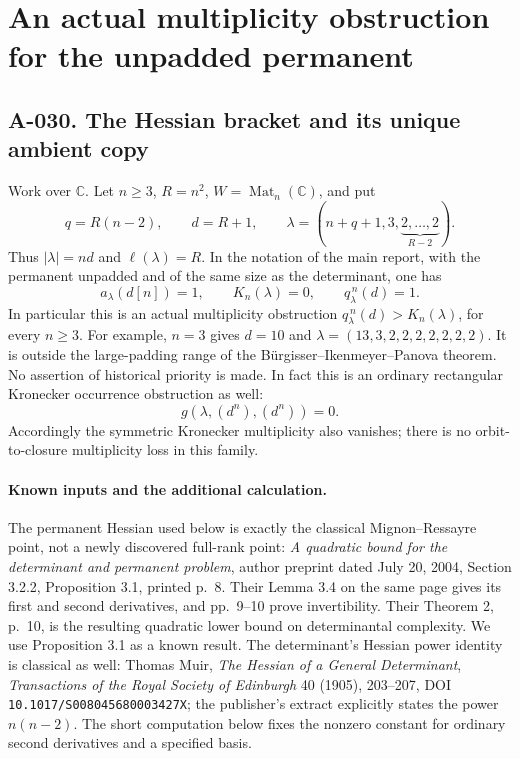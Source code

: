 \section{An actual multiplicity obstruction for the unpadded permanent}

\subsection*{A-030. The Hessian bracket and its unique ambient copy}
Work over \(\mathbb C\). Let \(n\geq3\), \(R=n^2\),
\(W=\operatorname{Mat}_n(\mathbb C)\), and put
\[
 q=R(n-2),\qquad d=R+1,\qquad
 \lambda=(n+q+1,3,\underbrace{2,\ldots,2}_{R-2}).       \tag{A-030.1}
\]
Thus \(|\lambda|=nd\) and \(\ell(\lambda)=R\).
In the notation of the main report, with the permanent unpadded
and of the same size as the determinant, one has
\[
 a_\lambda(d[n])=1,\qquad
 K_n(\lambda)=0,\qquad
 q_\lambda^{\,n}(d)=1.                               \tag{A-030.2}
\]
In particular this is an actual multiplicity obstruction
\(q_\lambda^{\,n}(d)>K_n(\lambda)\), for every \(n\geq3\).
For example, \(n=3\) gives \(d=10\) and
\(\lambda=(13,3,2,2,2,2,2,2,2)\).
It is outside the large-padding range of the B\"urgisser--Ikenmeyer--Panova
theorem. No assertion of historical priority is made.
In fact this is an ordinary rectangular Kronecker occurrence
obstruction as well:
\[
               g(\lambda,(d^n),(d^n))=0.                       \tag{A-030.2a}
\]
Accordingly the symmetric Kronecker multiplicity also vanishes;
there is no orbit-to-closure multiplicity loss in this family.

\paragraph{Known inputs and the additional calculation.}
The permanent Hessian used below is exactly the classical
Mignon--Ressayre point, not a newly discovered full-rank point:
\emph{A quadratic bound for the determinant and permanent problem},
author preprint dated July 20, 2004, Section 3.2.2,
Proposition 3.1, printed p.~8. Their Lemma 3.4 on the same page
gives its first and second derivatives, and pp.~9--10 prove
invertibility. Their Theorem 2, p.~10, is the resulting quadratic
lower bound on determinantal complexity. We use Proposition 3.1
as a known result. The determinant's Hessian power identity is
classical as well: Thomas Muir, \emph{The Hessian of a General
Determinant}, \emph{Transactions of the Royal Society of Edinburgh}
40 (1905), 203--207, DOI \texttt{10.1017/S008045680003427X};
the publisher's extract explicitly states the power
\(n(n-2)\). The short computation below fixes the nonzero
constant for ordinary second derivatives and a specified basis.

